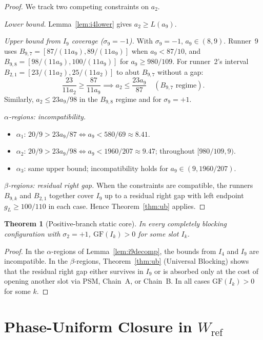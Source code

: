 \documentclass[12pt,a4paper]{amsart}
\newtheorem{theorem}{Theorem}[section]
\theoremstyle{definition}
\theoremstyle{remark}
\newcommand{\GF}{\mathrm{GF}}
\newcommand{\Wref}{W_{\mathrm{ref}}}
\begin{document}
\begin{proof}
We track two competing constraints on $a_2$.

\textit{Lower bound.} Lemma~\ref{lem:i4lower} gives $a_2\ge L(a_9)$.

\textit{Upper bound from $I_9$ coverage ($\sigma_9=-1$).} With $\sigma_9=-1$,
$a_9\in(8,9)$. Runner~9 uses $B_{9,7}=[87/(11a_9),89/(11a_9)]$ when $a_9<87/10$, and
$B_{9,8}=[98/(11a_9),100/(11a_9)]$ for $a_9\ge 980/109$. For runner~2's interval
$B_{2,1}=[23/(11a_2),25/(11a_2)]$ to abut $B_{9,7}$ without a gap:
\[
  \frac{23}{11a_2}\ge \frac{87}{11a_9} \implies a_2\le\frac{23a_9}{87}\quad
  (B_{9,7}\text{ regime}).
\]
Similarly, $a_2\le 23a_9/98$ in the $B_{9,8}$ regime and for $\sigma_9=+1$.

\textit{$\alpha$-regions: incompatibility.}
\begin{itemize}
  \item $\alpha_1$: $20/9>23a_9/87\iff a_9<580/69\approx 8.41$.
  \item $\alpha_2$: $20/9>23a_9/98\iff a_9<1960/207\approx 9.47$; throughout $[980/109,9)$.
  \item $\alpha_3$: same upper bound; incompatibility holds for $a_9\in(9,1960/207)$.
\end{itemize}

\textit{$\beta$-regions: residual right gap.} When the constraints are compatible,
the runners $B_{9,k}$ and $B_{2,1}$ together cover $I_9$ up to a residual right gap
with left endpoint $g_L\ge 100/110$ in each case. Hence Theorem~\ref{thm:ub} applies.
\end{proof}

\begin{theorem}[Positive-branch static core]\label{thm:poscore}
In every completely blocking configuration with $\sigma_2=+1$,
$\GF(I_k)>0$ for some slot $I_k$.
\end{theorem}

\begin{proof}
In the $\alpha$-regions of Lemma~\ref{lem:i9decomp}, the bounds from $I_4$ and $I_9$ are
incompatible. In the $\beta$-regions, Theorem~\ref{thm:ub} (Universal Blocking) shows that
the residual right gap either survives in $I_9$ or is absorbed only at the cost of opening
another slot via PSM, Chain~A, or Chain~B. In all cases $\GF(I_k)>0$ for some $k$.
\end{proof}

\section{Phase-Uniform Closure in \texorpdfstring{$\Wref$}{W\_ref}}
\label{sec:phase}
\end{document}
